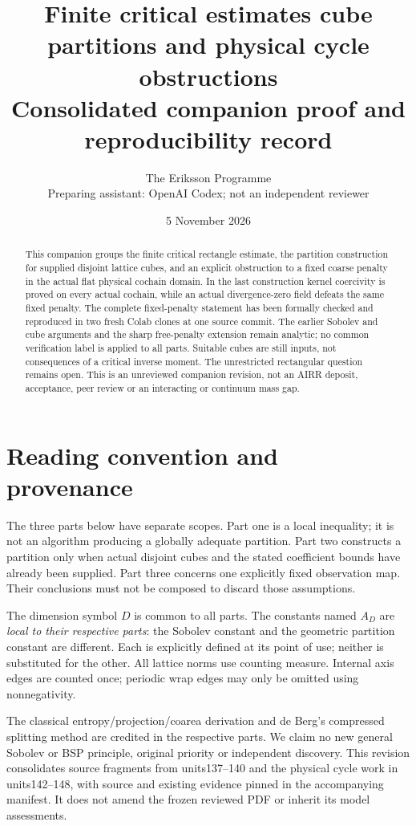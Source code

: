 \documentclass[11pt,a4paper]{article}
\title{Finite critical estimates cube partitions and physical cycle obstructions\\\large Consolidated companion proof and reproducibility record}
\author{The Eriksson Programme\\\small Preparing assistant: OpenAI Codex; not an independent reviewer}
\date{5 November 2026}
\begin{document}
\maketitle
\begin{abstract}
This companion groups the finite critical rectangle estimate, the partition
construction for supplied disjoint lattice cubes, and an explicit obstruction
to a fixed coarse penalty in the actual flat physical cochain domain. In the
last construction kernel coercivity is proved on every actual cochain,
while an actual divergence-zero field defeats the same fixed penalty.
The complete fixed-penalty statement has been formally checked and reproduced
in two fresh Colab clones at one source commit. The earlier Sobolev and cube
arguments and the sharp free-penalty extension remain analytic; no common
verification label is applied to all parts. Suitable cubes are still inputs,
not consequences of a critical inverse moment. The unrestricted rectangular
question remains open. This is an unreviewed companion revision, not an AIRR
deposit, acceptance, peer review or an interacting or continuum mass gap.
\end{abstract}
\section*{Reading convention and provenance}
The three parts below have separate scopes. Part one is a local inequality;
it is not an algorithm producing a globally adequate partition. Part two
constructs a partition only when actual disjoint cubes and the stated
coefficient bounds have already been supplied. Part three concerns one explicitly fixed observation map. Their conclusions must not
be composed to discard those assumptions.

The dimension symbol $D$ is common to all parts. The constants named
$A_D$ are \emph{local to their respective parts}: the Sobolev constant
and the geometric partition constant are different. Each is explicitly
defined at its point of use; neither is substituted for the other.
All lattice norms use counting measure. Internal axis edges are counted
once; periodic wrap edges may only be omitted using nonnegativity.

The classical entropy/projection/coarea derivation and de Berg's compressed
splitting method are credited in the respective parts. We claim no new
general Sobolev or BSP principle, original priority or independent discovery.
This revision consolidates source fragments from units137--140 and the physical cycle work in units142--148, with
source and existing evidence pinned in the accompanying manifest. It does
not amend the frozen reviewed PDF or inherit its model assessments.
\clearpage
\tableofcontents
\clearpage

\clearpage

\clearpage

\end{document}
